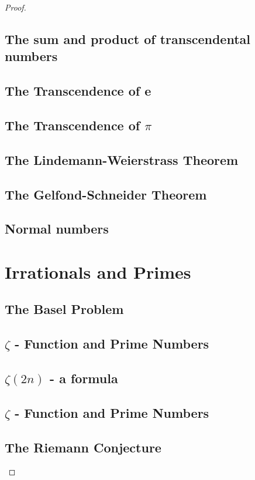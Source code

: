 \documentclass{article}
\theoremstyle{definition}
\begin{document}
\begin{proof}
\newpage 
\subsection{The sum and product of transcendental numbers}
\subsection{The Transcendence of e}
\subsection{The Transcendence of $\pi$}
\subsection{The Lindemann-Weierstrass Theorem}
\subsection{The Gelfond-Schneider Theorem}

\subsection{Normal numbers}



\section{Irrationals and Primes}
\subsection{The Basel Problem}
\subsection{$\zeta$ - Function and Prime Numbers}
\subsection{$\zeta(2n)$ - a formula}
\subsection{$\zeta$ - Function and Prime Numbers}
\subsection{The Riemann Conjecture}
















\end{proof}
\end{document}

